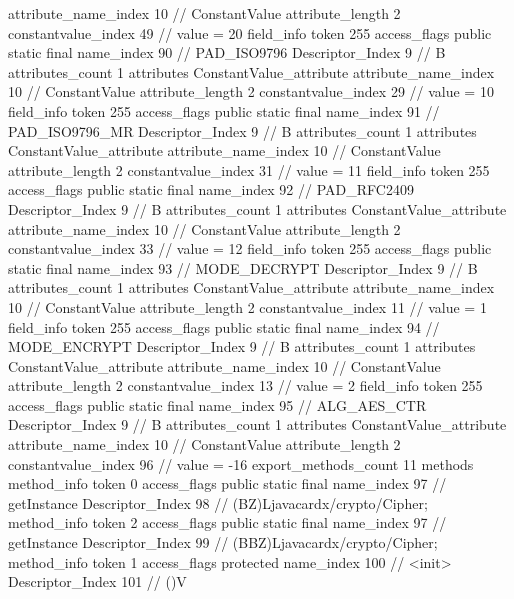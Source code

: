 {{{{{{{					attribute_name_index	10		// ConstantValue
					attribute_length	2
					constantvalue_index	49		// value = 20
				}
				}
			}
			field_info {
				token	255
				access_flags	public static final
				name_index	90		// PAD_ISO9796
				Descriptor_Index	9		// B
				attributes_count	1
				attributes {
				ConstantValue_attribute {
					attribute_name_index	10		// ConstantValue
					attribute_length	2
					constantvalue_index	29		// value = 10
				}
				}
			}
			field_info {
				token	255
				access_flags	public static final
				name_index	91		// PAD_ISO9796_MR
				Descriptor_Index	9		// B
				attributes_count	1
				attributes {
				ConstantValue_attribute {
					attribute_name_index	10		// ConstantValue
					attribute_length	2
					constantvalue_index	31		// value = 11
				}
				}
			}
			field_info {
				token	255
				access_flags	public static final
				name_index	92		// PAD_RFC2409
				Descriptor_Index	9		// B
				attributes_count	1
				attributes {
				ConstantValue_attribute {
					attribute_name_index	10		// ConstantValue
					attribute_length	2
					constantvalue_index	33		// value = 12
				}
				}
			}
			field_info {
				token	255
				access_flags	public static final
				name_index	93		// MODE_DECRYPT
				Descriptor_Index	9		// B
				attributes_count	1
				attributes {
				ConstantValue_attribute {
					attribute_name_index	10		// ConstantValue
					attribute_length	2
					constantvalue_index	11		// value = 1
				}
				}
			}
			field_info {
				token	255
				access_flags	public static final
				name_index	94		// MODE_ENCRYPT
				Descriptor_Index	9		// B
				attributes_count	1
				attributes {
				ConstantValue_attribute {
					attribute_name_index	10		// ConstantValue
					attribute_length	2
					constantvalue_index	13		// value = 2
				}
				}
			}
			field_info {
				token	255
				access_flags	public static final
				name_index	95		// ALG_AES_CTR
				Descriptor_Index	9		// B
				attributes_count	1
				attributes {
				ConstantValue_attribute {
					attribute_name_index	10		// ConstantValue
					attribute_length	2
					constantvalue_index	96		// value = -16
				}
				}
			}
			}
			export_methods_count	11
			methods {
				method_info {
					token	0
					access_flags	public static final
					name_index	97		// getInstance
					Descriptor_Index	98		// (BZ)Ljavacardx/crypto/Cipher;
				}
				method_info {
					token	2
					access_flags	public static final
					name_index	97		// getInstance
					Descriptor_Index	99		// (BBZ)Ljavacardx/crypto/Cipher;
				}
				method_info {
					token	1
					access_flags	protected
					name_index	100		// <init>
					Descriptor_Index	101		// ()V
}}}}}
